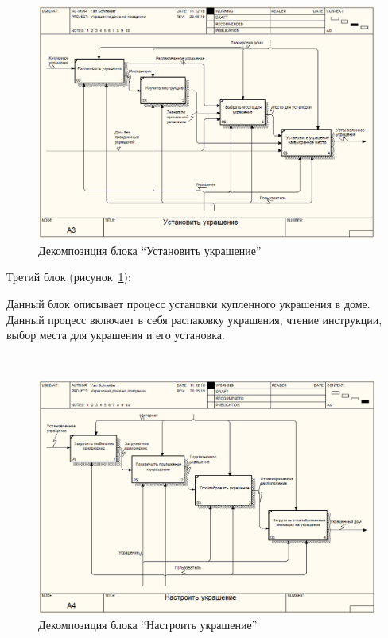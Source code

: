  ~
\begin{figure}[H]
\centering
	\includegraphics[scale=0.45]{figures/functionalModel/a3_install.png}
	\caption{Декомпозиция блока \enquote{Установить украшение}}
	\label{fig:analysis:functionalModel:a3_install}
\end{figure}

Третий блок (рисунок~\ref{fig:analysis:functionalModel:a3_install}):

Данный блок описывает процесс установки купленного украшения в доме. Данный процесс включает в себя распаковку украшения, чтение инструкции, выбор места для украшения и его установка.

 ~
\begin{figure}[H]
\centering
	\includegraphics[scale=0.45]{figures/functionalModel/a4_settings.png}
	\caption{Декомпозиция блока \enquote{Настроить украшение}}
	\label{fig:analysis:functionalModel:a4_settings}
\end{figure}

